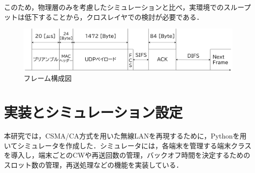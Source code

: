 \documentclass[a4paper, 10pt]{ltjsarticle}
\begin{document}
このため，物理層のみを考慮したシミュレーションと比べ，実環境でのスループットは低下することから，クロスレイヤでの検討が必要である．

\begin{figure}[htbp]
  \centering
  \includegraphics[width=1\columnwidth]{./assets/packet.png}
  \caption{フレーム構成図}
  \label{packet}
\end{figure}

\vspace{-2em}






\vspace{-0.5em}

\section{実装とシミュレーション設定}

本研究では，CSMA/CA方式を用いた無線LANを再現するために，Pythonを用いてシミュレータを作成した．シミュレータには，各端末を管理する端末クラスを導入し，端末ごとのCWや再送回数の管理，バックオフ時間を決定するためのスロット数の管理，再送処理などの機能を実装している．
\end{document}
